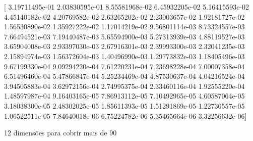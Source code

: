 [  3.19711495e-01   2.03830595e-01   8.55581968e-02   6.45932205e-02
   5.16415593e-02   4.45140182e-02   4.20769582e-02   2.63265202e-02
   2.23003657e-02   1.92181727e-02   1.56530890e-02   1.35927222e-02
   1.17014219e-02   9.56801114e-03   8.73324557e-03   7.66494521e-03
   7.19440487e-03   5.65594900e-03   5.27313939e-03   4.88119527e-03
   3.65904008e-03   2.93397030e-03   2.67916301e-03   2.39993300e-03
   2.32041235e-03   2.15894974e-03   1.56372604e-03   1.40496990e-03
   1.29773832e-03   1.18405496e-03   9.67199330e-04   9.09294220e-04
   7.61220231e-04   7.23698228e-04   7.00007358e-04   6.51496460e-04
   5.47866847e-04   5.25234469e-04   4.87530637e-04   4.04216524e-04
   3.94505883e-04   3.62972156e-04   2.74995375e-04   2.33460116e-04
   1.92555220e-04   1.48597987e-04   9.16403165e-05   7.86913112e-05
   7.10492965e-05   4.60587064e-05   3.18038300e-05   2.48302025e-05
   1.85611393e-05   1.51291869e-05   1.22736557e-05   1.06522511e-05
   7.84640018e-06   6.75224782e-06   5.35465664e-06   3.32256632e-06]

12 dimensões para cobrir mais de 90
